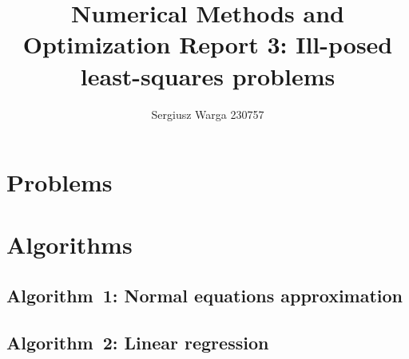 \documentclass[a4paper]{article}
\title{Numerical Methods and Optimization Report 3:
Ill-posed least-squares problems}
\author{Sergiusz Warga 230757}
\date{}
\begin{document}
\maketitle
\tableofcontents
\pagebreak

\section{Problems}








\clearpage

\section{Algorithms}
\subsection{Algorithm~1: Normal equations approximation}%
\label{algorithm:1}

\subsection{Algorithm~2: Linear regression}%
\label{algorithm:2}



\clearpage

\nocite{Zdunek, GoluVanl96, Meyer}


\end{document}
